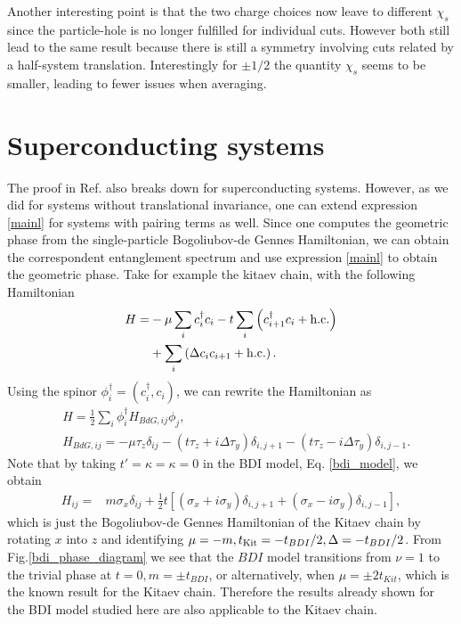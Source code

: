 \documentclass[twocolumn,amsmath,longbibliography,amssymb,superscriptaddress]{revtex4-1}
\begin{document}
Another interesting point is that the two charge choices now leave to different $\chi_s$ since the particle-hole is no longer fulfilled for individual cuts. However both still lead to the same result because there is still a symmetry involving cuts related by a half-system translation. Interestingly for $\pm 1/2$ the quantity $\chi_s$ seems to be smaller, leading to fewer issues when averaging. 



\section{Superconducting systems}

The proof in Ref.\cite{Zaletel2014} also breaks down for superconducting systems. However, as we did for systems without translational invariance, one can extend expression \ref{mainl} for systems with pairing terms as well. Since one computes the geometric phase from the single-particle Bogoliubov-de Gennes Hamiltonian, we can obtain the correspondent entanglement spectrum and use expression \ref{mainl} to obtain the geometric phase. Take for example the kitaev chain, with the following Hamiltonian
\begin{align*}
H =& -\mu \sum_{i} c_i^\dagger c_i - t \sum_{i}\left( c_{i+1}^\dagger c_i + {\rm h.c.}\right) \\
&+  \sum_{i}\left( \Delta c_{i} c_{i+1} + {\rm h.c.}\right).
\end{align*}
Using the spinor $\phi_i^\dagger = (c_i^\dagger, c_i)$, we can rewrite the Hamiltonian as
\begin{align*}
&H = \frac{1}{2}\sum_i \phi^\dagger_i H_{BdG,ij} \phi_j,\\
&H_{BdG,ij} = -\mu \tau_z \delta_{ij} - (t \tau_z + i\Delta \tau_y )\delta_{i,j+1}- (t \tau_z - i\Delta \tau_y)\delta_{i,j-1}.
\end{align*}
Note that by taking $t' = \kappa = \kappa = 0$ in the BDI model, Eq. \ref{bdi_model}, we obtain
\begin{align*}
H_{ij} =& m \sigma_x\delta_{ij} + \frac{1}{2} t \left[(\sigma_x + i \sigma_y)\delta_{i,j+1} + (\sigma_x - i \sigma_y) \delta_{i,j-1} \right],
\end{align*}
which is just the Bogoliubov-de Gennes Hamiltonian of the Kitaev chain by rotating $x$ into $z$ and identifying $\mu = -m, t_{\rm Kit} = -t_{BDI}/2, \Delta = -t_{BDI}/2 $. From Fig.\ref{bdi_phase_diagram} we see that the $BDI$ model transitions from $\nu = 1$ to the trivial phase at $t=0, m=\pm t_{BDI}$, or alternatively, when $\mu = \pm 2 t_{Kit}$, which is the known result for the Kitaev chain. Therefore the results already shown for the BDI model studied here are also applicable to the Kitaev chain.  
\end{document}
